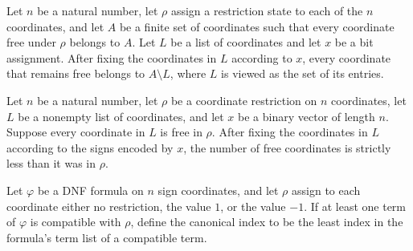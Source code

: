 \begin{theorem}
\label{FABL.CoordRestriction.freeWithin_fixCoordinateList}
\leanok
{}
Let $n$ be a natural number, let $\rho$ assign a restriction state to each of the $n$
coordinates, and let $A$ be a finite set of coordinates such that every coordinate free
under $\rho$ belongs to $A$. Let $L$ be a list of coordinates and let $x$ be a bit
assignment. After fixing the coordinates in $L$ according to $x$, every coordinate that
remains free belongs to $A\setminus L$, where $L$ is viewed as the set of its entries.
\end{theorem}

\begin{theorem}
\label{FABL.CoordRestriction.card_freeCoordinates_fixCoordinateList_lt}
\leanok
{}
Let $n$ be a natural number, let $\rho$ be a coordinate restriction on $n$ coordinates,
let $L$ be a nonempty list of coordinates, and let $x$ be a binary vector of length $n$.
Suppose every coordinate in $L$ is free in $\rho$. After fixing the coordinates in $L$
according to the signs encoded by $x$, the number of free coordinates is strictly less
than it was in $\rho$.
\end{theorem}

\begin{definition}
\label{FABL.DNFFormula.canonicalTermIndex}
\leanok
{}
Let $\varphi$ be a DNF formula on $n$ sign coordinates, and let $\rho$ assign to each
coordinate either no restriction, the value $1$, or the value $-1$. If at least one term
of $\varphi$ is compatible with $\rho$, define the canonical index to be the least index
in the formula's term list of a compatible term.
\end{definition}

